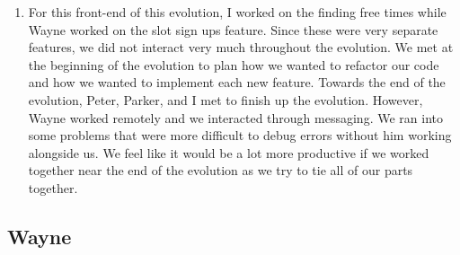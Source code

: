\documentclass[11pt]{article}   %
\begin{document}
\begin{enumerate} [a)]
\begin{enumerate} [$\cdot$]
\item For this front-end of this evolution, I worked on the finding free times while Wayne worked on the slot sign ups feature. Since these were very separate features, we did not interact very much throughout the evolution. We met at the beginning of the evolution to plan how we wanted to refactor our code and how we wanted to implement each new feature. Towards the end of the evolution, Peter, Parker, and I met to finish up the evolution. However, Wayne worked remotely and we interacted through messaging. We ran into some problems that were more difficult to debug errors without him working alongside us. We feel like it would be a lot more productive if we worked together near the end of the evolution as we try to tie all of our parts together.
\end{enumerate}
\end{enumerate}
\subsection*{Wayne}
\end{document}

